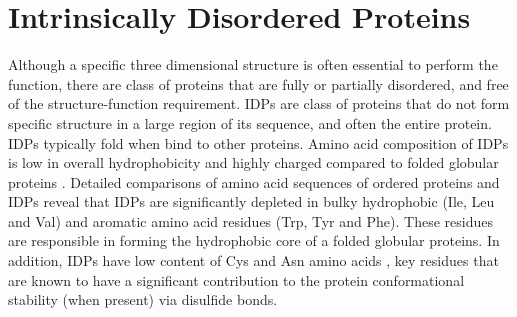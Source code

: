 \documentclass[../talant.diss.submit.tex]{subfiles}
\begin{document}
\section{\textbf{Intrinsically Disordered Proteins}}\label{sect:one_three}

Although a specific three dimensional structure is often essential to perform
the function, there are class of proteins that are fully or partially
disordered, and free of the structure-function
requirement. %
IDPs are class of proteins that do not form specific structure in a large region
of its sequence, and often the entire protein. IDPs typically fold when bind to
other proteins. Amino acid composition of IDPs is low in overall
hydrophobicity and highly charged compared to folded globular proteins \cite{uversky:00n}.
Detailed comparisons of amino acid
sequences of ordered proteins and IDPs reveal that IDPs are significantly
depleted in bulky hydrophobic (Ile, Leu and Val) and aromatic amino acid
residues (Trp, Tyr and Phe). These residues are responsible in forming the
hydrophobic core of a folded globular proteins. In addition, IDPs have low
content of Cys and Asn amino acids \cite{dunker:01int}, key residues that are
known to have a significant contribution to the protein conformational stability
(when present) via disulfide bonds.
\end{document}
